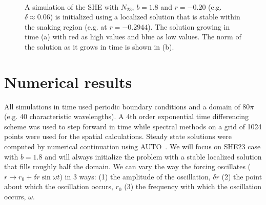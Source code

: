 \documentclass[pre,preprint,superscriptaddress]{revtex4-1}
\begin{document}
\begin{figure}[h!]
  \begin{center}
    \mbox{
       \quad
      }
    \caption{A simulation of the SHE with $N_{23}$, $b=1.8$ and $r=-0.20$ (e.g. $\delta\approx 0.06$) is initialized using a localized solution that is stable within the snaking region (e.g. at $r=-0.2944$). The solution growing in time (a) with red as high values and blue as low values.  The norm of the solution as it grows in time is shown in (b).}
    \label{fig:nucleation}
  \end{center}
\end{figure} 

\section{Numerical results}

All simulations in time used periodic boundary conditions and a domain of $80\pi$ (e.g. 40 characteristic wavelengths).  A 4th order exponential time differencing scheme\cite{cox2002} was used to step forward  in time while spectral methods on a grid of 1024 points were used for the spatial calculations.  Steady state solutions were computed by numerical continuation using AUTO~\cite{doedel1981auto}.   We will focus on SHE23 case with $b=1.8$ and will always initialize the problem with a stable localized solution that fills roughly half the domain.  We can vary the way the forcing oscillates ($r\rightarrow r_0+\delta r \sin\omega t$) in 3 ways: (1) the amplitude of the oscillation, $\delta r$ (2) the point about which the oscillation occurs, $r_0$ (3) the frequency with which the oscillation occurs, $\omega$.
\end{document}
